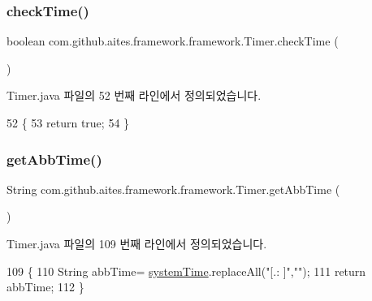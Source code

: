 \subsubsection{\texorpdfstring{check\+Time()}{checkTime()}}
{\footnotesize\ttfamily boolean com.\+github.\+aites.\+framework.\+framework.\+Timer.\+check\+Time (\begin{DoxyParamCaption}{ }\end{DoxyParamCaption})}



Timer.\+java 파일의 52 번째 라인에서 정의되었습니다.


\begin{DoxyCode}
52                               \{
53         \textcolor{keywordflow}{return} \textcolor{keyword}{true};
54     \}
\end{DoxyCode}
\mbox{\label{classcom_1_1github_1_1aites_1_1framework_1_1framework_1_1_timer_a352607b26b1b13cef49ab6d75d575955}} 
\subsubsection{\texorpdfstring{get\+Abb\+Time()}{getAbbTime()}}
{\footnotesize\ttfamily String com.\+github.\+aites.\+framework.\+framework.\+Timer.\+get\+Abb\+Time (\begin{DoxyParamCaption}{ }\end{DoxyParamCaption})}



Timer.\+java 파일의 109 번째 라인에서 정의되었습니다.


\begin{DoxyCode}
109                               \{
110         String abbTime= \mbox{\hyperlink{classcom_1_1github_1_1aites_1_1framework_1_1framework_1_1_timer_a22ebaa7134740910d846b3bdbd416aef}{systemTime}}.replaceAll(\textcolor{stringliteral}{"[.: ]"},\textcolor{stringliteral}{""});
111         \textcolor{keywordflow}{return} abbTime;
112     \}
\end{DoxyCode}
\mbox{\label{classcom_1_1github_1_1aites_1_1framework_1_1framework_1_1_timer_a7903fc53f33b3c29f586e5996f56d80e}} 
